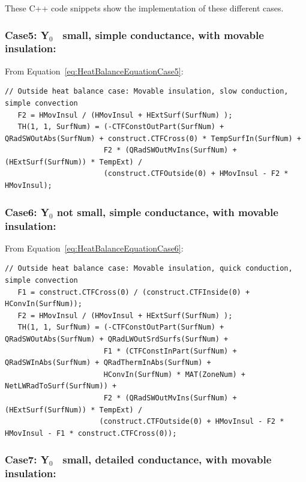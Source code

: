 These C++ code snippets show the implementation of these different cases.

\subsubsection{Case5: Y\(_{0}\)~ small, simple conductance, with movable insulation:}\label{case5-yux5f0-small-simple-conductance-with-movable-insulation-1}

From Equation~\ref{eq:HeatBalanceEquationCase5}:

\begin{lstlisting}
// Outside heat balance case: Movable insulation, slow conduction, simple convection
   F2 = HMovInsul / (HMovInsul + HExtSurf(SurfNum) );
   TH(1, 1, SurfNum) = (-CTFConstOutPart(SurfNum) + QRadSWOutAbs(SurfNum) + construct.CTFCross(0) * TempSurfIn(SurfNum) +
                       F2 * (QRadSWOutMvIns(SurfNum) + (HExtSurf(SurfNum)) * TempExt) /
                       (construct.CTFOutside(0) + HMovInsul - F2 * HMovInsul);
\end{lstlisting}

\subsubsection{Case6: Y\(_{0}\) not small, simple conductance, with movable insulation:}\label{case6-yux5f0-not-small-simple-conductance-with-movable-insulation-1}

From Equation~\ref{eq:HeatBalanceEquationCase6}:

\begin{lstlisting}
// Outside heat balance case: Movable insulation, quick conduction, simple convection
   F1 = construct.CTFCross(0) / (construct.CTFInside(0) + HConvIn(SurfNum));
   F2 = HMovInsul / (HMovInsul + HExtSurf(SurfNum) );
   TH(1, 1, SurfNum) = (-CTFConstOutPart(SurfNum) + QRadSWOutAbs(SurfNum) + QRadLWOutSrdSurfs(SurfNum) +
                       F1 * (CTFConstInPart(SurfNum) + QRadSWInAbs(SurfNum) + QRadThermInAbs(SurfNum) + 
                       HConvIn(SurfNum) * MAT(ZoneNum) + NetLWRadToSurf(SurfNum)) +
                       F2 * (QRadSWOutMvIns(SurfNum) + (HExtSurf(SurfNum)) * TempExt) /
                      (construct.CTFOutside(0) + HMovInsul - F2 * HMovInsul - F1 * construct.CTFCross(0));
\end{lstlisting}

\subsubsection{Case7: Y\(_{0}\)~ small, detailed conductance, with movable insulation:}\label{case7-yux5f0-small-detailed-conductance-with-movable-insulation-1}

